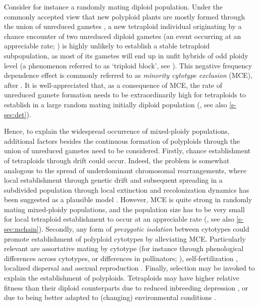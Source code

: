 \documentclass[12pt,a4paper]{article}
\begin{document}
Consider for instance a randomly mating diploid population.
Under the commonly accepted view that new polyploid plants are mostly formed
through the union of unreduced gametes
\citep{bretagnolle1995,herben2016,kreiner2017b}, a new tetraploid individual
originating by a chance encounter of two unreduced diploid gametes (an event
occurring at an appreciable rate; \cite{kreiner2017}) is highly unlikely to
establish a stable tetraploid subpopulation, as most of its gametes will end up
in unfit hybrids of odd ploidy level (a phenomenon referred to as `triploid
block', see \cite{ramsey1998,kohler2010,brown2024}).
This negative frequency dependence effect is commonly referred to as
\textit{minority cytotype exclusion} (MCE), after \cite{levin1975}.
It is well-appreciated that, as a consequence of MCE, the rate of unreduced
gamete formation needs to be extraordinarily high for tetraploids to establish
in a large random mating initially diploid population (\cite{felber1997}, see
also \cref{s-sec:det}).

Hence, to explain the widespread occurrence of mixed-ploidy populations,
additional factors besides the continuous formation of polyploids through the
union of unreduced gametes need to be considered.
Firstly, chance establishment of tetraploids through drift could occur.
Indeed, the problem is somewhat analogous to the spread of underdominant
chromosomal rearrangements, where local establishment through genetic drift and
subsequent spreading in a subdivided population through local extinction and 
recolonization dynamics has been suggested as a plausible model
\citep{lande1985}.
However, MCE is quite strong in randomly mating mixed-ploidy populations, and
the population size has to be very small for local tetraploid establishment to
occur at an appreciable rate (\cite{rausch2005}, see also \cref{s-sec:mchain}).
Secondly, any form of \textit{prezygotic isolation} between cytotypes could
promote establishment of polyploid cytotypes by alleviating MCE.
Particularly relevant are assortative mating by cytotype  (for instance through
phenological differences across cytotypes, or differences in pollinators;
\cite{kolar2017}), self-fertilization \citep{rausch2005,novikova2023}, 
localized dispersal \citep{baack2005,kolar2017} and asexual reproduction
\citep{vandrunen2022}.
Finally, selection may be invoked to explain the establishment of polyploids.
Tetraploids may have higher relative fitness than their diploid counterparts
due to reduced inbreeding depression
\citep{ronfort1999,otto2000,husband2008,clo2022b}, or due to being
better adapted to (changing) environmental conditions \citep{vandepeer2021}. 
\end{document}
